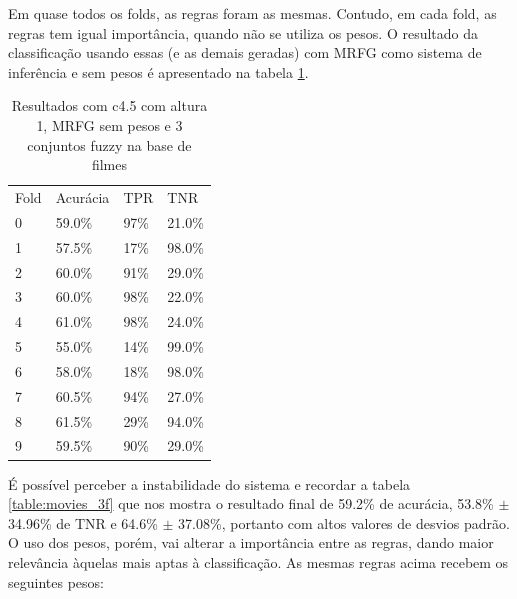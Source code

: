 \documentclass[template.tex]{subfiles}
\begin{document}
Em quase todos os folds, as regras foram as mesmas. Contudo, em cada fold, as regras tem igual importância, quando não se utiliza os pesos. O resultado da classificação usando essas (e as demais geradas) com MRFG como sistema de inferência e sem pesos é apresentado na tabela \ref{table:movie_folds_2}.

\begin{table}[htbp]
	\centering
    \begin{tabular}{llll}
    Fold & Acurácia & TPR & TNR \\
    0 & 59.0\% & 97\% & 21.0\% \\
    1 & 57.5\% & 17\% & 98.0\% \\
    2 & 60.0\% & 91\% & 29.0\% \\
    3 & 60.0\% & 98\% & 22.0\% \\
    4 & 61.0\% & 98\% & 24.0\% \\
    5 & 55.0\% & 14\% & 99.0\% \\
    6 & 58.0\% & 18\% & 98.0\% \\
    7 & 60.5\% & 94\% & 27.0\% \\
    8 & 61.5\% & 29\% & 94.0\% \\
    9 & 59.5\% & 90\% & 29.0\% \\
    \end{tabular}
        \caption{Resultados com c4.5 com altura 1, MRFG sem pesos e 3 conjuntos fuzzy na base de filmes}
    \label{table:movie_folds_2}
\end{table}


É possível perceber a instabilidade do sistema e recordar a tabela \ref{table:movies_3f} que nos mostra o resultado final de 59.2\% de acurácia, 53.8\% $\pm$ 34.96\% de TNR e 64.6\% $\pm$ 37.08\%, portanto com altos valores de desvios padrão. O uso dos pesos, porém, vai alterar a importância entre as regras, dando maior relevância àquelas mais aptas à classificação. As mesmas regras acima recebem os seguintes pesos:
\end{document}
